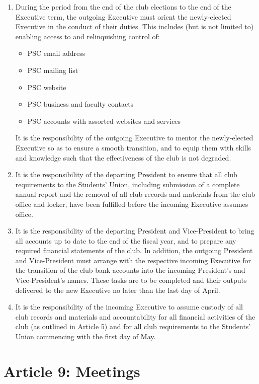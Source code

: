 \documentclass{article}
\begin{document}
\begin{enumerate}
    \item During the period from the end of the club elections to the end of the Executive term, the outgoing Executive must orient the newly-elected Executive in the conduct of their duties.
        This includes (but is not limited to) enabling access to and relinquishing control of:
        \begin{itemize}
            \item PSC email address
            \item PSC mailing list
            \item PSC website
            \item PSC business and faculty contacts
            \item PSC accounts with assorted websites and services
        \end{itemize}
        It is the responsibility of the outgoing Executive to mentor the newly-elected Executive so as to ensure a smooth transition, and to equip them with skills and knowledge such that the effectiveness of the club is not degraded.
    \item It is the responsibility of the departing President to ensure that all club requirements to the Students' Union, including submission of a complete annual report and the removal of all club records and materials from the club office and locker, have been fulfilled before the incoming Executive assumes office.
    \item It is the responsibility of the departing President and Vice-President to bring all accounts up to date to the end of the fiscal year, and to prepare any required financial statements of the club. 
In addition, the outgoing President and Vice-President must arrange with the respective incoming Executive for the transition of the club bank accounts into the incoming President's and Vice-President's names. These tasks are to be completed and their outputs delivered to the new Executive no later than the last day of April.
    \item It is the responsibility of the incoming Executive to assume custody of all club records and materials and accountability for all financial activities of the club (as outlined in Article 5) and for all club requirements to the Students' Union commencing with the first day of May.
\end{enumerate}

\section{Article 9: Meetings}
\end{document}
